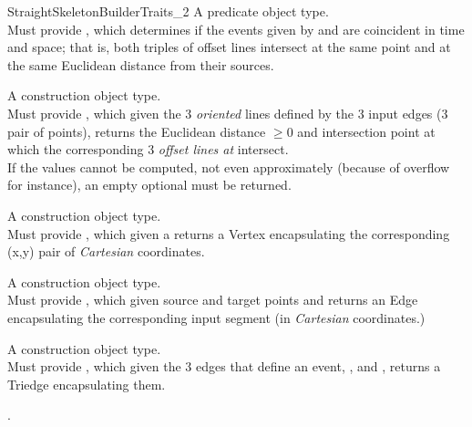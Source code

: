 \begin{ccRefConcept}{StraightSkeletonBuilderTraits_2}
{A predicate object type.\\
Must provide , which determines if the events given by  and  are coincident in time and space; that is, both triples of offset lines intersect at the same point and at the same Euclidean distance from their sources.\\
}

{A construction object type.\\
Must provide , which given the 3 \textit{oriented} lines defined by the 3 input edges (3 pair of points), returns the Euclidean distance  $\geq 0$ and intersection point at which the corresponding 3 \textit{offset lines at } intersect.\\
If the values cannot be computed, not even approximately (because of overflow for instance), an empty optional must be returned.\\
}

{A construction object type.\\
Must provide , which given a   returns a Vertex encapsulating the corresponding (x,y) pair of \textit{Cartesian} coordinates.}

{A construction object type.\\
Must provide , which given source and target points  and  returns an Edge encapsulating the corresponding input segment (in \textit{Cartesian} coordinates.)}

{A construction object type.\\
Must provide , which given the 3 edges that define an event, ,  and , returns a Triedge encapsulating them.}

\ccHasModels

.

\ccSeeAlso

\\
\\

\end{ccRefConcept}

